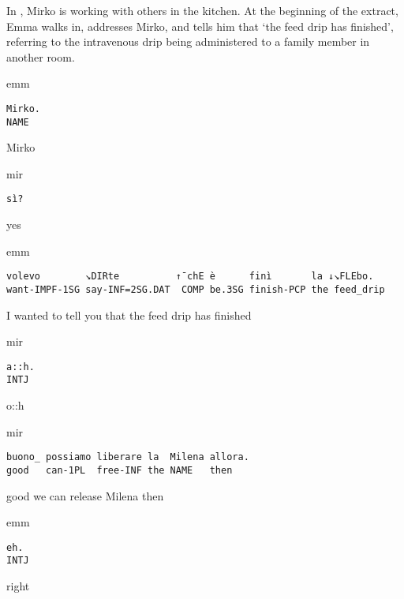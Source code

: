 \documentclass[output=paper,modfonts]{langscibook}
\begin{document}
In , Mirko is working with others in the kitchen. At the beginning of the extract, Emma walks in, addresses Mirko, and tells him that ‘the feed drip has finished’, referring to the intravenous drip being administered to a family member in another room.

\vspace{2mm}
%
\begin{transbox}{1}{emm}
\begin{verbatim}
Mirko.
NAME
\end{verbatim}
Mirko
\end{transbox}\vspace{1.5mm}
%
\begin{transbox}{2}{mir}
\begin{verbatim}
sì?
\end{verbatim}
yes
\end{transbox}\vspace{1mm}
%
\vspace{-1mm}
%
\begin{mdframednoverticalspace}[style=firstfoc]
\begin{transbox}{4}{emm}
\begin{verbatim}
volevo        ↘DIRte          ↑¯chE è      finì       la ↓↘FLEbo.
want-IMPF-1SG say-INF=2SG.DAT  COMP be.3SG finish-PCP the feed_drip
\end{verbatim}
I wanted to tell you that the feed drip has finished
\end{transbox}
\end{mdframednoverticalspace}\vspace{1mm}
%
\vspace{-1mm}
%
\begin{mdframednoverticalspace}[style=secondfoc]
\begin{transbox}{6}{mir}
\begin{verbatim}
a::h.
INTJ
\end{verbatim}
o::h
\end{transbox}
\end{mdframednoverticalspace}\vspace{1.5mm}
%
\vspace{-1mm}
%
\begin{mdframednoverticalspace}[style=secondfoc]
\begin{transbox}{8}{mir}
\begin{verbatim}
buono_ possiamo liberare la  Milena allora.
good   can-1PL  free-INF the NAME   then
\end{verbatim}
good we can release Milena then
\end{transbox}
\end{mdframednoverticalspace}\vspace{-1mm}
%
\begin{transbox}{9}{emm}
\begin{verbatim}
eh.
INTJ
\end{verbatim}
right
\end{transbox}\bigskip
\end{document}
